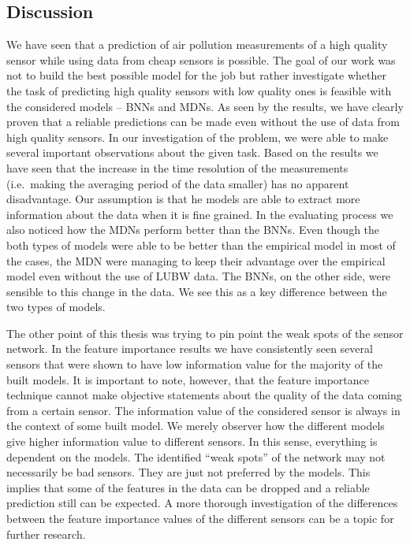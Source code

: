 \documentclass[12pt,a4paper,twoside]{scrartcl}
\numberwithin{equation}{section}
\begin{document}
\subsection{Discussion}
We have seen that a prediction of air pollution measurements of a high quality sensor while using data from cheap sensors is possible. The goal of our work was not to build the best possible model for the job but rather investigate whether the task of predicting high quality sensors with low quality ones is feasible with the considered models -- BNNs and MDNs. As seen by the results, we have clearly proven that a reliable predictions can be made even without the use of data from high quality sensors. In our investigation of the problem, we were able to make several important observations about the given task. Based on the results we have seen that the increase in the time resolution of the measurements (i.e.\ making the averaging period of the data smaller) has no apparent disadvantage. Our assumption is that he models are able to extract more information about the data when it is fine grained. In the evaluating process we also noticed how the MDNs perform better than the BNNs. Even though the both types of models were able to be better than the empirical model in most of the cases, the MDN were managing to keep their advantage over the empirical model even without the use of LUBW data. The BNNs, on the other side, were sensible to this change in the data. We see this as a key difference between the two types of models.

The other point of this thesis was trying to pin point the weak spots of the sensor network. In the feature importance results we have consistently seen several sensors that were shown to have low information value for the majority of the built models. It is important to note, however, that the feature importance technique cannot make objective statements about the quality of the data coming from a certain sensor. The information value of the considered sensor is always in the context of some built model. We merely observer how the different models give higher information value to different sensors. In this sense, everything is dependent on the models. The identified ``weak spots'' of the network may not necessarily be bad sensors. They are just not preferred by the models. This implies that some of the features in the data can be dropped and a reliable prediction still can be expected. A more thorough investigation of the differences between the feature importance values of the different sensors can be a topic for further research.
\end{document}
